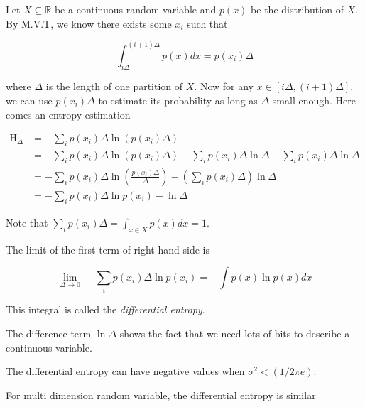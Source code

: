 \documentclass{article}
\begin{document}
            Let $ X \subseteq \mathbb{R} $ be a continuous random variable and $ p(x) $ be the
            distribution of $ X $. By M.V.T, we know there exists some $ x_i $
            such that

            \begin{equation*}
                 \int_{i \Delta}^{ (i+1)\Delta }p(x) dx = p(x_i) \Delta
            \end{equation*}

            where $ \Delta $ is the length of one partition of $ X $. Now for any
            $ x \in [i \Delta, (i + 1) \Delta]$, we can use $ p(x_i) \Delta $ to estimate
            its probability as long as $ \Delta $ small enough. Here comes an
            entropy estimation

            \begin{align*}
                \operatorname{H}_{\Delta} &= - \sum_i p(x_i) \Delta \ln( p(x_i) \Delta) \\
                      &= - \sum_i p(x_i) \Delta \ln(p(x_i) \Delta) + \sum_i p(x_i) \Delta \ln \Delta - \sum_i p(x_i) \Delta \ln \Delta \\
                      &= - \sum_i p(x_i) \Delta \ln \left( \frac{p(x_i) \Delta}{\Delta} \right) - \left( \sum_i p(x_i) \Delta \right) \ln \Delta \\
                      &= - \sum_i p(x_i) \Delta \ln p(x_i) - \ln \Delta
            \end{align*}

            Note that $ \sum_i p(x_i) \Delta = \int_{x \in X} p(x) dx = 1 $.

            The limit of the first term of right hand side is

            \begin{equation*}
                 \lim_{\Delta \rightarrow 0} - \sum_i p(x_i) \Delta \ln p(x_i)
                 = - \int p(x) \ln p(x) dx
            \end{equation*}

            This integral is called the \textit{differential entropy}.

            The difference term $ \ln \Delta $ shows the fact that we need lots of bits to
            describe a continuous variable.

            The differential entropy can have negative values when $ \sigma^2 < (1 / 2 \pi e) $.

            For multi dimension random variable, the differential entropy is similar
\end{document}
